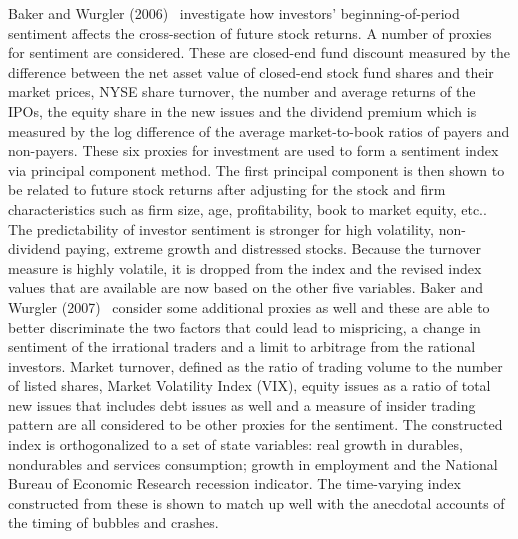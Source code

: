  
 Baker and Wurgler (2006)~\cite{baker2006investor} investigate how investors' beginning-of-period sentiment affects the cross-section of future stock returns. A number of proxies for sentiment are considered. These are closed-end fund discount measured by the difference between the net asset value of closed-end stock fund shares and their market prices, NYSE share turnover, the number and average returns of the IPOs, the equity share in the new issues and the dividend premium which is measured by the log difference of the average market-to-book ratios of payers and non-payers. These six proxies for investment are used to form a sentiment index via principal component method. The first principal component is then shown to be related to future stock returns after adjusting for the stock and firm characteristics such as firm size, age, profitability, book to market equity, etc.. The predictability of investor sentiment is stronger for high volatility, non-dividend paying, extreme growth and distressed stocks. Because the turnover measure is highly volatile, it is dropped from the index and the revised index values that are available are now based on the other five variables. Baker and Wurgler (2007)~\cite{baker2007investor} consider some additional proxies as well and these are able to better discriminate the two factors that could lead to mispricing, a change in sentiment of the irrational traders and a limit to arbitrage from the rational investors. Market turnover, defined as the ratio of trading volume to the number of listed shares, Market Volatility Index (VIX), equity issues as a ratio of total new issues that includes debt issues as well and a measure of insider trading pattern are all considered to be other proxies for the sentiment. The constructed index is orthogonalized to a set of state variables: real growth in durables, nondurables and services consumption; growth in employment and the National Bureau of Economic Research recession indicator. The time-varying index constructed from these is shown to match up well with the anecdotal accounts of the timing of bubbles and crashes.
 
